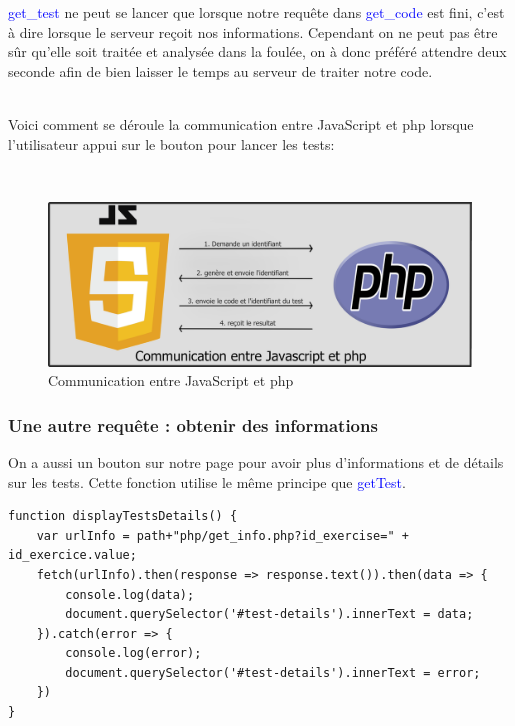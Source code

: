 \documentclass[a4paper]{article}
\renewcommand{\texttt}[2][blue]{\textcolor{#1}{\ttfamily #2}}
\begin{document}
\texttt{get\_test} ne peut se lancer que lorsque notre requête dans
\texttt{get\_code} est fini, c'est à dire lorsque le serveur reçoit nos
informations. Cependant on ne peut pas être sûr qu'elle soit traitée et
analysée dans la foulée, on à donc préféré attendre deux seconde afin de bien
laisser le temps au serveur de traiter notre code.

\\

Voici comment se déroule la communication entre JavaScript et php lorsque
l'utilisateur appui sur le bouton pour lancer les tests:

\\

\begin{figure}[htbp]
  \centering
  \includegraphics[scale=0.16]{./img_rapport/shema_com_js_php.png}
  \caption{Communication entre JavaScript et php}
  \label{fig-page-web-v1}
\end{figure}


\subsubsection{Une autre requête : obtenir des informations}
\label{subsec:getInfo}

On a aussi un bouton sur notre page pour avoir plus d'informations et de détails
sur les tests. Cette fonction utilise le même principe que \texttt{getTest}.

\begin{lstlisting}[language=JS]
function displayTestsDetails() {
    var urlInfo = path+"php/get_info.php?id_exercise=" + id_exercice.value;
    fetch(urlInfo).then(response => response.text()).then(data => {
        console.log(data);
        document.querySelector('#test-details').innerText = data;
    }).catch(error => {
        console.log(error);
        document.querySelector('#test-details').innerText = error;
    })
}
\end{lstlisting}
\end{document}
